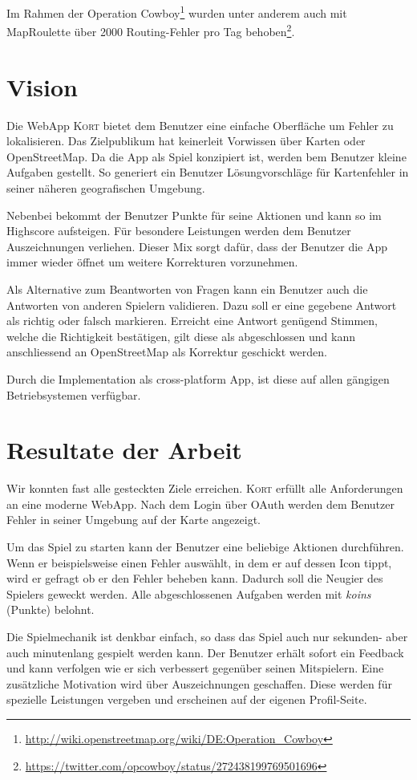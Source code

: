 Im Rahmen der Operation Cowboy\footnote{\url{http://wiki.openstreetmap.org/wiki/DE:Operation_Cowboy}} wurden unter anderem auch mit MapRoulette über 2000 Routing-Fehler pro Tag behoben\footnote{\url{https://twitter.com/opcowboy/status/272438199769501696}}.

\section{Vision}
Die \gls{WebApp} \textsc{Kort} bietet dem Benutzer eine einfache Oberfläche um Fehler zu lokalisieren.
Das Zielpublikum hat keinerleit Vorwissen über Karten oder OpenStreetMap.
Da die App als Spiel konzipiert ist, werden bem Benutzer kleine Aufgaben gestellt.
So generiert ein Benutzer Lösungvorschläge für Kartenfehler in seiner näheren geografischen Umgebung.

Nebenbei bekommt der Benutzer Punkte für seine Aktionen und kann so im Highscore aufsteigen.
Für besondere Leistungen werden dem Benutzer Auszeichnungen verliehen.
Dieser Mix sorgt dafür, dass der Benutzer die App immer wieder öffnet um weitere Korrekturen vorzunehmen.

Als Alternative zum Beantworten von Fragen kann ein Benutzer auch die Antworten von anderen Spielern validieren.
Dazu soll er eine gegebene Antwort als richtig oder falsch markieren.
Erreicht eine Antwort genügend Stimmen, welche die Richtigkeit bestätigen, gilt diese als abgeschlossen und kann anschliessend an OpenStreetMap als Korrektur geschickt werden.

Durch die Implementation als cross-platform App, ist diese auf allen gängigen Betriebsystemen verfügbar.

\section{Resultate der Arbeit}
Wir konnten fast alle gesteckten Ziele erreichen.
\textsc{Kort} erfüllt alle Anforderungen an eine moderne \gls{WebApp}.
Nach dem Login über \gls{OAuth} werden dem Benutzer Fehler in seiner Umgebung auf der Karte angezeigt.

Um das Spiel zu starten kann der Benutzer eine beliebige Aktionen durchführen.
Wenn er beispielsweise einen Fehler auswählt, in dem er auf dessen Icon tippt, wird er gefragt ob er den Fehler beheben kann.
Dadurch soll die Neugier des Spielers geweckt werden.
Alle abgeschlossenen Aufgaben werden mit \emph{koins} (Punkte) belohnt.

Die Spielmechanik ist denkbar einfach, so dass das Spiel auch nur sekunden- aber auch  minutenlang gespielt werden kann.
Der Benutzer erhält sofort ein Feedback und kann verfolgen wie er sich verbessert gegenüber seinen Mitspielern.
Eine zusätzliche Motivation wird über Auszeichnungen geschaffen.
Diese werden für spezielle Leistungen vergeben und erscheinen auf der eigenen Profil-Seite.

